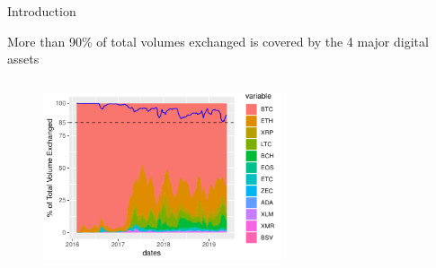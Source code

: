 \documentclass[aspectratio=169]{beamer}
\begin{document}
\begin{frame}[noframenumbering]{Introduction}
        \begin{minipage}[t][1.2cm][c]{\dimexpr\textwidth-2\fboxsep-2\fboxrule\relax}
        More than 90\% of total volumes exchanged is covered by the 4 major digital assets
        \end{minipage}
		\begin{figure}
			\centering
			\includegraphics[height=5.7cm, width=7cm]{Images/volline.pdf}
		\end{figure}
\end{frame}
\end{document}

